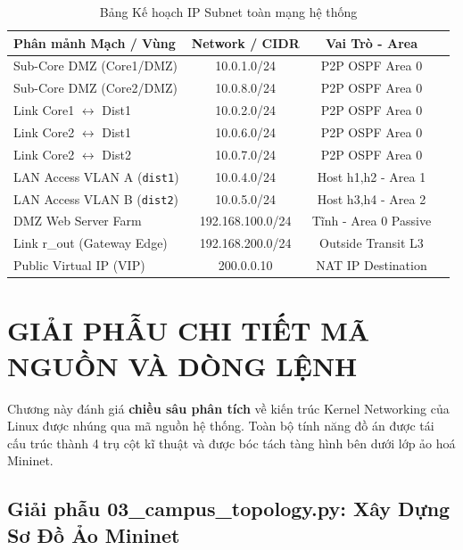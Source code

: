 \documentclass[12pt,a4paper]{report}
\begin{document}
\begin{table}[H]
    \centering
    \begin{tabularx}{\textwidth}{|X|c|c|X|}
        \hline
        \textbf{Phân mảnh Mạch / Vùng} & \textbf{Network / CIDR} & \textbf{Vai Trò - Area} \\ \hline
        Sub-Core DMZ (Core1/DMZ)  & 10.0.1.0/24  & P2P OSPF Area 0 \\ \hline
        Sub-Core DMZ (Core2/DMZ)  & 10.0.8.0/24  & P2P OSPF Area 0 \\ \hline
        Link Core1 $\leftrightarrow$ Dist1 & 10.0.2.0/24  & P2P OSPF Area 0 \\ \hline
        Link Core2 $\leftrightarrow$ Dist1 & 10.0.6.0/24  & P2P OSPF Area 0 \\ \hline
        Link Core2 $\leftrightarrow$ Dist2 & 10.0.7.0/24  & P2P OSPF Area 0 \\ \hline
        LAN Access VLAN A (\texttt{dist1}) & 10.0.4.0/24  & Host h1,h2 - Area 1 \\ \hline
        LAN Access VLAN B (\texttt{dist2}) & 10.0.5.0/24  & Host h3,h4 - Area 2 \\ \hline
        DMZ Web Server Farm  & 192.168.100.0/24 & Tĩnh - Area 0 Passive \\ \hline
        Link r\_out (Gateway Edge)& 192.168.200.0/24 & Outside Transit L3 \\ \hline
        Public Virtual IP (VIP) & 200.0.0.10 & NAT IP Destination \\ \hline
    \end{tabularx}
    \caption{Bảng Kế hoạch IP Subnet toàn mạng hệ thống}
\end{table}

\chapter{GIẢI PHẪU CHI TIẾT MÃ NGUỒN VÀ DÒNG LỆNH}
Chương này đánh giá \textbf{chiều sâu phân tích} về kiến trúc Kernel Networking của Linux được nhúng qua mã nguồn hệ thống. Toàn bộ tính năng đồ án được tái cấu trúc thành 4 trụ cột kĩ thuật và được bóc tách tàng hình bên dưới lớp ảo hoá Mininet.

\section{Giải phẫu 03\_campus\_topology.py: Xây Dựng Sơ Đồ Ảo Mininet}
\end{document}
